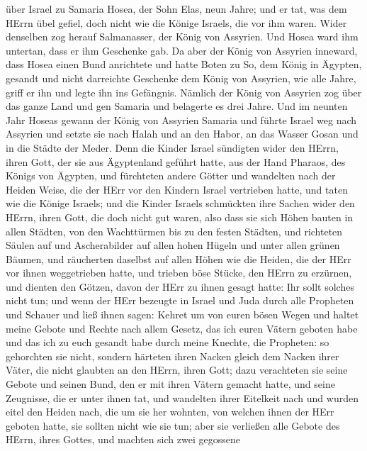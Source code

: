 über Israel zu Samaria Hosea, der Sohn Elas, neun Jahre; 
und er tat, was dem HErrn übel gefiel, doch nicht wie die Könige
Israels, die vor ihm waren.  Wider denselben zog herauf
Salmanasser, der König von Assyrien. Und Hosea ward ihm untertan, dass
er ihm Geschenke gab.  Da aber der König von Assyrien
inneward, dass Hosea einen Bund anrichtete und hatte Boten zu So, dem
König in Ägypten, gesandt und nicht darreichte Geschenke dem König von
Assyrien, wie alle Jahre, griff er ihn und legte ihn ins Gefängnis.
 Nämlich der König von Assyrien zog über das ganze Land und
gen Samaria und belagerte es drei Jahre.  Und im neunten
Jahr Hoseas gewann der König von Assyrien Samaria und führte Israel weg
nach Assyrien und setzte sie nach Halah und an den Habor, an das Wasser
Gosan und in die Städte der Meder.  Denn die Kinder Israel
sündigten wider den HErrn, ihren Gott, der sie aus Ägyptenland geführt
hatte, aus der Hand Pharaos, des Königs von Ägypten, und fürchteten
andere Götter  und wandelten nach der Heiden Weise, die der
HErr vor den Kindern Israel vertrieben hatte, und taten wie die Könige
Israels;  und die Kinder Israels schmückten ihre Sachen
wider den HErrn, ihren Gott, die doch nicht gut waren, also dass sie
sich Höhen bauten in allen Städten, von den Wachttürmen bis zu den
festen Städten,  und richteten Säulen auf und Ascherabilder
auf allen hohen Hügeln und unter allen grünen Bäumen,  und
räucherten daselbst auf allen Höhen wie die Heiden, die der HErr vor
ihnen weggetrieben hatte, und trieben böse Stücke, den HErrn zu
erzürnen,  und dienten den Götzen, davon der HErr zu ihnen
gesagt hatte: Ihr sollt solches nicht tun;  und wenn der
HErr bezeugte in Israel und Juda durch alle Propheten und Schauer und
ließ ihnen sagen: Kehret um von euren bösen Wegen und haltet meine
Gebote und Rechte nach allem Gesetz, das ich euren Vätern geboten habe
und das ich zu euch gesandt habe durch meine Knechte, die Propheten:
 so gehorchten sie nicht, sondern härteten ihren Nacken
gleich dem Nacken ihrer Väter, die nicht glaubten an den HErrn, ihren
Gott;  dazu verachteten sie seine Gebote und seinen Bund,
den er mit ihren Vätern gemacht hatte, und seine Zeugnisse, die er unter
ihnen tat, und wandelten ihrer Eitelkeit nach und wurden eitel den
Heiden nach, die um sie her wohnten, von welchen ihnen der HErr geboten
hatte, sie sollten nicht wie sie tun;  aber sie verließen
alle Gebote des HErrn, ihres Gottes, und machten sich zwei gegossene
